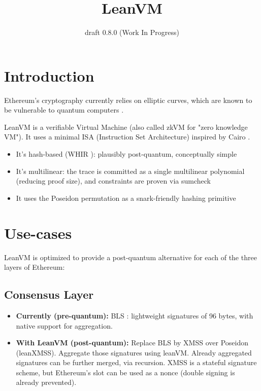 \documentclass{article}
\title{LeanVM}
\author{draft 0.8.0 (Work In Progress)}
\date{}
\theoremstyle{definition}
\begin{document}
\maketitle

\tableofcontents
\newpage

\section{Introduction}
Ethereum's cryptography currently relies on elliptic curves, which are known to be vulnerable to quantum computers \cite{shor}.

LeanVM is a verifiable Virtual Machine (also called zkVM for "zero knowledge VM"). It uses a minimal ISA (Instruction Set Architecture) inspired by Cairo \cite{cairo}.
\begin{itemize}
    \item It's hash-based (WHIR \cite{whir}): plausibly post-quantum, conceptually simple
    \item It's multilinear: the trace is committed as a single multilinear polynomial (reducing proof size), and constraints are proven via sumcheck \cite{sumcheck}
    \item It uses the Poseidon \cite{poseidon1} permutation as a snark-friendly hashing primitive
\end{itemize}

\section{Use-cases}

LeanVM is optimized to provide a post-quantum alternative for each of the three layers of Ethereum:

\subsection{Consensus Layer}
\begin{itemize}
    \item \textbf{Currently (pre-quantum):} BLS \cite{bls}: lightweight signatures of 96 bytes, with native support for aggregation.
    \item \textbf{With LeanVM (post-quantum):} Replace BLS by XMSS over Poseidon \cite{ethereum_signatures} (leanXMSS). Aggregate those signatures using leanVM. Already aggregated signatures can be further merged, via recursion. XMSS is a stateful signature scheme, but Ethereum's slot can be used as a nonce (double signing is already prevented).
\end{itemize}
\end{document}
